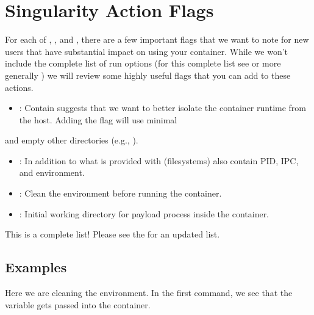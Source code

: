\documentclass[letterpaper,10pt,english]{sphinxmanual}
\begin{document}
\section{Singularity Action Flags}
\label{\detokenize{appendix:singularity-action-flags}}\label{\detokenize{appendix:id29}}\label{\detokenize{appendix:sec-action-flags}}
For each of , , and , there are a few important flags that we want to note for new users that have substantial impact on using
your container. While we won’t include the complete list of run options (for this complete list see  or more generally
) we will review some highly useful flags that you can add to these actions.
\begin{itemize}
\item {} 
: Contain suggests that we want to better isolate the container runtime from the host. Adding the  flag will use minimal

\end{itemize}

 and empty other directories (e.g., ).
\begin{itemize}
\item {} 
: In addition to what is provided with  (filesystems) also contain PID, IPC, and environment.

\item {} 
: Clean the environment before running the container.

\item {} 
: Initial working directory for payload process inside the container.

\end{itemize}

This is  a complete list! Please see the  for an updated list.


\subsection{Examples}
\label{\detokenize{appendix:examples}}
Here we are cleaning the environment. In the first command, we see that the variable  gets passed into the container.
\end{document}

